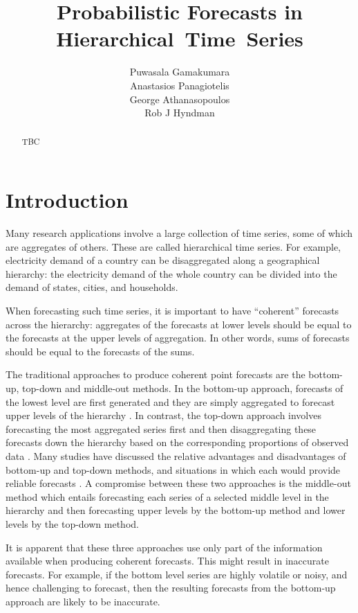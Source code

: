 \documentclass[a4paper, 11pt]{article}
\title{Probabilistic Forecasts in Hierarchical~Time~Series}
\author{Puwasala Gamakumara\\ Anastasios Panagiotelis\\ George Athanasopoulos\\ Rob J Hyndman}
\begin{document}
  
\maketitle

\begin{abstract}
  TBC
\end{abstract}


\section{Introduction}\label{sec:intro}

Many research applications involve a large collection of time series, some of which are aggregates of others. These are called hierarchical time series. For example, electricity demand of a country can be disaggregated along a geographical hierarchy: the electricity demand of the whole country can be divided into the demand of states, cities, and households. 

When forecasting such time series, it is important to have ``coherent'' forecasts across the hierarchy: aggregates of the forecasts at lower levels should be equal to the forecasts at the upper levels of aggregation. In other words, sums of forecasts should be equal to the forecasts of the sums.

The traditional approaches to produce coherent point forecasts are the bottom-up, top-down and middle-out methods. In the bottom-up approach, forecasts of the lowest level are first generated and they are simply aggregated to forecast upper levels of the hierarchy \citep{Dunn1976}. In contrast, the top-down approach involves forecasting the most aggregated series first and then disaggregating these forecasts down the hierarchy based on the corresponding proportions of observed data \citep{Gross1990}. Many studies have discussed the relative advantages and disadvantages of bottom-up and top-down methods, and situations in which each would provide reliable forecasts \citep{Schwarzkopf1988,Kahn1998, Lapide1998,Fliedner2001}. A compromise between these two approaches is the middle-out method which entails forecasting each series of a selected middle level in the hierarchy and then forecasting upper levels by the bottom-up method and lower levels by the top-down method. 

It is apparent that these three approaches use only part of the information available when producing coherent forecasts. This might result in inaccurate forecasts. For example, if the bottom level series are highly volatile or noisy, and hence challenging to forecast, then the resulting forecasts from the bottom-up approach are likely to be inaccurate.
\end{document}
